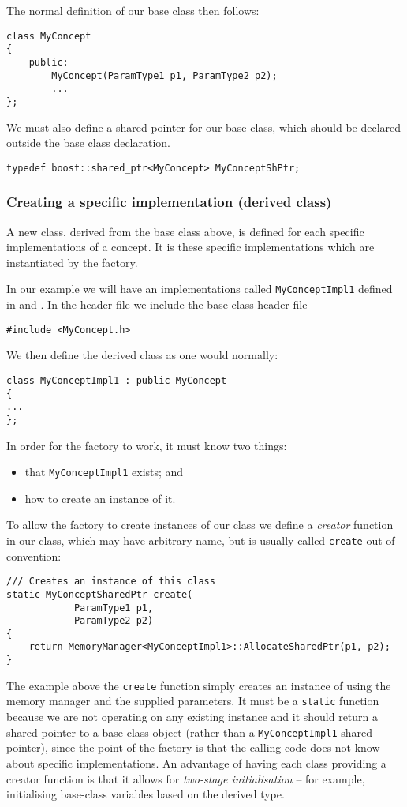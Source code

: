 The normal definition of our base class then follows:
\begin{lstlisting}
class MyConcept 
{
    public:
        MyConcept(ParamType1 p1, ParamType2 p2);
        ...
};
\end{lstlisting}

We must also define a shared pointer for our base class, which should be declared outside the base class declaration.
\begin{lstlisting}
typedef boost::shared_ptr<MyConcept> MyConceptShPtr;
\end{lstlisting}


\subsubsection{Creating a specific implementation (derived class)}
A new class, derived from the base class above, is defined for each specific implementations of a concept. It is these
specific implementations which are instantiated by the factory.

In our example we will have an implementations called \lstinline{MyConceptImpl1}
defined in  and . In the
header file we include the base class header file
\begin{lstlisting}
#include <MyConcept.h>
\end{lstlisting}

We then define the derived class as one would normally:
\begin{lstlisting}
class MyConceptImpl1 : public MyConcept
{
...
};
\end{lstlisting}

In order for the factory to work, it must know two things:
\begin{itemize}
\item that \lstinline{MyConceptImpl1} exists; and
\item how to create an instance of it.
\end{itemize}

To allow the factory to create instances of our class we define a \emph{creator} function in our class, which may have arbitrary name, but is usually called \lstinline{create} out of convention:
\begin{lstlisting}
/// Creates an instance of this class
static MyConceptSharedPtr create(
            ParamType1 p1,
            ParamType2 p2)
{
    return MemoryManager<MyConceptImpl1>::AllocateSharedPtr(p1, p2);
}
\end{lstlisting}
The example above the \lstinline{create} function simply creates an instance of  using the {\nek} memory manager and the
supplied parameters. It must be a \lstinline{static} function because we are not operating on any existing instance and it should return a shared pointer to a base class object (rather than a \lstinline{MyConceptImpl1} shared pointer), since the point of the factory is that the calling code does not know about specific implementations. An advantage of having each class providing a creator function is that it allows for \emph{two-stage initialisation} -- for example, initialising base-class variables based on the derived type.

